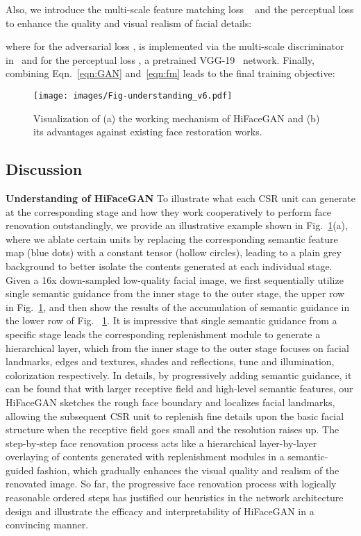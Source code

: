 \documentclass[sigconf]{acmart}
\begin{document}
Also, we introduce the multi-scale feature matching loss ~\cite{pix2pixHD} and the perceptual loss \cite{perceptual_loss} to enhance the quality and visual realism of facial details:


where for the adversarial loss ,  is implemented via the multi-scale discriminator  in~\cite{pix2pixHD} and for the perceptual loss , a pretrained VGG-19~\cite{vgg} network.
Finally, combining Eqn.~\eqref{eqn:GAN} and~\eqref{eqn:fm} leads to the final training objective:


\begin{figure}[!t]
  \centering
\texttt{[image: images/Fig-understanding\_v6.pdf]}
  \caption{Visualization of (a) the working mechanism of HiFaceGAN and (b) its advantages against existing face restoration works.
  }\label{fig:interp}
\end{figure}







\subsection{Discussion}\label{sec:understanding}
\textbf{Understanding of HiFaceGAN} To illustrate what each CSR unit can generate at the corresponding stage and how they work cooperatively to perform face renovation outstandingly, we provide an illustrative example shown in Fig.~\ref{fig:interp}(a), where we ablate certain units by replacing the corresponding semantic feature map (blue dots) with a constant tensor (hollow circles), leading to a plain grey background to better isolate the contents generated at each individual stage. Given a 16x down-sampled low-quality facial image, we first sequentially utilize single semantic guidance from the inner stage to the outer stage, the upper row in Fig.~\ref{fig:interp}, and then show the results of the accumulation of semantic guidance in the lower row of Fig. ~\ref{fig:interp}. It is impressive that single semantic guidance from a specific stage leads the corresponding replenishment module to generate a hierarchical layer, which from the inner stage to the outer stage focuses on facial landmarks, edges and textures, shades and reflections, tune and illumination, colorization respectively. In details, by progressively adding semantic guidance, it can be found that with larger receptive field and high-level semantic features, our HiFaceGAN sketches the rough face boundary and localizes facial landmarks, allowing the subsequent CSR unit to replenish fine details upon the basic facial structure when the receptive field goes small and the resolution raises up. The step-by-step face renovation process acts like a hierarchical layer-by-layer overlaying of contents generated with replenishment modules in a semantic-guided fashion, which gradually enhances the visual quality and realism of the renovated image. So far, the progressive face renovation process with logically reasonable ordered steps has justified our heuristics in the network architecture design and illustrate the efficacy and interpretability of HiFaceGAN in a convincing manner.
\end{document}
